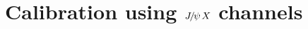 
\section{Calibration using \texorpdfstring{${{J\mskip -3mu/\mskip -2mu\psi\mskip 2mu}}X$}{JpsiX} channels}
\label{sec:tagging:jpsixcalibration}